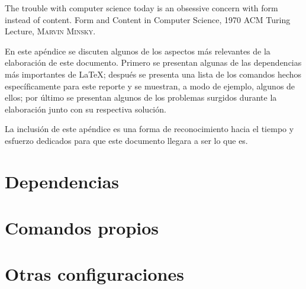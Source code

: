 %
%

{
  \epigrafe
  {%
    The trouble with computer science today is an obsessive concern with
    form instead of content.%
  }
  {%
    Form and Content in Computer Science, 1970 ACM Turing Lecture,
    \textsc{Marvin Minsky}.%
  }
}

\noindent
En este apéndice se discuten algunos de los aspectos más relevantes de la
elaboración de este documento. Primero se presentan algunas de las dependencias
más importantes de \LaTeX; después se presenta una lista de los comandos hechos
específicamente para este reporte y se muestran, a modo de ejemplo, algunos de
ellos; por último se presentan algunos de los problemas surgidos durante la
elaboración junto con su respectiva solución.

La inclusión de este apéndice es una forma de reconocimiento hacia el tiempo y
esfuerzo dedicados para que este documento llegara a ser lo que es.

\section{Dependencias}

\section{Comandos propios}

\section{Otras configuraciones}

